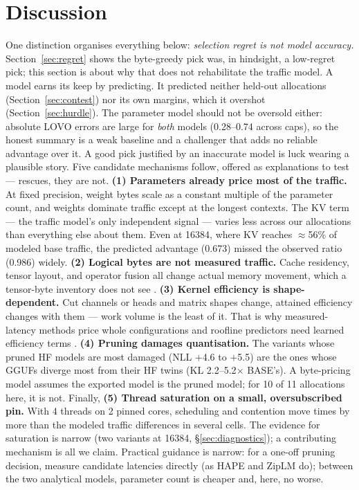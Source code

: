 \documentclass[10pt,letterpaper,twocolumn]{article}
\begin{document}
\section{Discussion}
One distinction organises everything below: \emph{selection
regret is not model accuracy.} Section~\ref{sec:regret} shows the
byte-greedy pick was, in hindsight, a low-regret pick; this
section is about why that does not rehabilitate the traffic
model. A model earns its keep by predicting. It predicted
neither held-out allocations (Section~\ref{sec:contest}) nor its
own margins, which it overshot (Section~\ref{sec:hurdle}).
The parameter model should not be oversold either: absolute LOVO
errors are large for \emph{both} models (0.28--0.74 across caps),
so the honest summary is a weak baseline and a challenger that
adds no reliable advantage over it. A good pick justified by an
inaccurate model is luck wearing a plausible story. Five candidate
mechanisms follow, offered as explanations to test --- rescues,
they are not.
\textbf{(1) Parameters already price most of the traffic.} At
fixed precision, weight bytes scale as a constant multiple of the
parameter count, and weights dominate traffic except at the
longest contexts. The KV term --- the traffic model's only
independent signal --- varies less across our allocations than
everything else about them. Even at 16384, where KV reaches
$\approx$56\% of modeled base traffic, the predicted advantage
(0.673) missed the observed ratio (0.986) widely.
\textbf{(2) Logical bytes are not measured
traffic.} Cache residency, tensor layout, and operator fusion all change actual memory movement, which a tensor-byte inventory does not see \citep{hape2025}.
\textbf{(3) Kernel efficiency is shape-dependent.} Cut channels
or heads and matrix shapes change, attained efficiency changes
with them --- work volume is the least of it. That is why
measured-latency methods price whole configurations
\citep{ziplm2023} and roofline predictors need learned
efficiency terms \citep{kernelsight2026}.
\textbf{(4) Pruning damages quantisation.} The variants whose
pruned HF models are most damaged (NLL $+$4.6 to $+$5.5) are the
ones whose GGUFs diverge most from their HF twins (KL
2.2--5.2$\times$ BASE's). A byte-pricing model assumes the
exported model is the pruned model; for 10 of 11 allocations
here, it is not. Finally, \textbf{(5) Thread
saturation on a small, oversubscribed pin.} With 4 threads on 2
pinned cores, scheduling and contention move times by more than
the modeled traffic differences in several cells. The evidence
for saturation is narrow (two variants at 16384,
\S\ref{sec:diagnostics}); a contributing mechanism is all we
claim. Practical guidance is narrow: for a one-off pruning
decision, measure candidate latencies directly (as HAPE and
ZipLM do); between the two analytical models, parameter count
is cheaper and, here, no worse.
\end{document}
